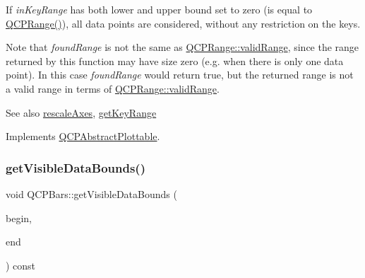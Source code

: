 If {\itshape in\+Key\+Range} has both lower and upper bound set to zero (is equal to {\ttfamily \mbox{\hyperlink{class_q_c_p_range}{Q\+C\+P\+Range()}}}), all data points are considered, without any restriction on the keys.

Note that {\itshape found\+Range} is not the same as \mbox{\hyperlink{class_q_c_p_range_ab38bd4841c77c7bb86c9eea0f142dcc0}{Q\+C\+P\+Range\+::valid\+Range}}, since the range returned by this function may have size zero (e.\+g. when there is only one data point). In this case {\itshape found\+Range} would return true, but the returned range is not a valid range in terms of \mbox{\hyperlink{class_q_c_p_range_ab38bd4841c77c7bb86c9eea0f142dcc0}{Q\+C\+P\+Range\+::valid\+Range}}.

\begin{DoxySeeAlso}{See also}
\mbox{\hyperlink{class_q_c_p_abstract_plottable_a1491c4a606bccd2d09e65e11b79eb882}{rescale\+Axes}}, \mbox{\hyperlink{class_q_c_p_bars_ac5a3854774d9d9cd129b1eae1426de2d}{get\+Key\+Range}} 
\end{DoxySeeAlso}


Implements \mbox{\hyperlink{class_q_c_p_abstract_plottable_a4de773988b21ed090fddd27c6a3a3dcb}{Q\+C\+P\+Abstract\+Plottable}}.

\mbox{\label{class_q_c_p_bars_ac8b6b514a665a7bff4fb080413ba996a}} 
\subsubsection{\texorpdfstring{getVisibleDataBounds()}{getVisibleDataBounds()}}
{\footnotesize\ttfamily void Q\+C\+P\+Bars\+::get\+Visible\+Data\+Bounds (\begin{DoxyParamCaption}\item[{\mbox{\hyperlink{class_q_c_p_data_container_ae40a91f5cb0bcac61d727427449b7d15}{Q\+C\+P\+Bars\+Data\+Container\+::const\+\_\+iterator}} \&}]{begin,  }\item[{\mbox{\hyperlink{class_q_c_p_data_container_ae40a91f5cb0bcac61d727427449b7d15}{Q\+C\+P\+Bars\+Data\+Container\+::const\+\_\+iterator}} \&}]{end }\end{DoxyParamCaption}) const\hspace{0.3cm}{\ttfamily [protected]}}

\mbox{\label{class_q_c_p_bars_ac22e00a6a41509538c21b04f0a57318c}} 
